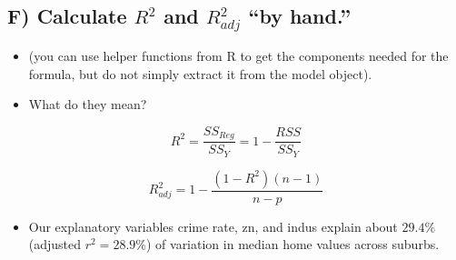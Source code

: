 \documentclass[
  letterpaper,
  DIV=11,
  numbers=noendperiod]{scrartcl}
\newenvironment{Shaded}{\begin{snugshade}}{\end{snugshade}}
\newcommand{\AttributeTok}[1]{\textcolor[rgb]{0.40,0.45,0.13}{#1}}
\newcommand{\CommentTok}[1]{\textcolor[rgb]{0.37,0.37,0.37}{#1}}
\newcommand{\DecValTok}[1]{\textcolor[rgb]{0.68,0.00,0.00}{#1}}
\newcommand{\FunctionTok}[1]{\textcolor[rgb]{0.28,0.35,0.67}{#1}}
\newcommand{\NormalTok}[1]{\textcolor[rgb]{0.00,0.23,0.31}{#1}}
\newcommand{\SpecialCharTok}[1]{\textcolor[rgb]{0.37,0.37,0.37}{#1}}
\providecommand{\tightlist}{%
  \setlength{\itemsep}{0pt}\setlength{\parskip}{0pt}}\usepackage{longtable,booktabs,array}
\begin{document}
\subsection{\texorpdfstring{F) Calculate \(R^2\) and \(R^2_{adj}\) ``by
hand.''}{F) Calculate R\^{}2 and R\^{}2\_\{adj\} ``by hand.''}}\label{f-calculate-r2-and-r2_adj-by-hand.}

\begin{itemize}
\item
  (you can use helper functions from R to get the components needed for
  the formula, but do not simply extract it from the model object).
\item
  What do they mean?
\end{itemize}

\[
R^2=\dfrac{SS_{Reg}}{SS_Y}=1-\dfrac{RSS}{SS_Y}
\]

\[
R^2_{adj}=1-\dfrac{(1-R^2)(n-1)}{n-p}
\]

\begin{itemize}
\tightlist
\item
  Our explanatory variables crime rate, zn, and indus explain about
  \(29.4\%\) (adjusted \(r^2 = 28.9\%\)) of variation in median home
  values across suburbs.
\end{itemize}

\begin{Shaded}
\end{Shaded}
\end{document}
